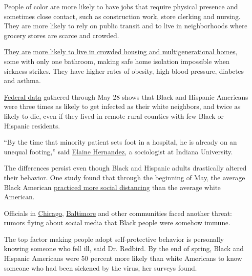 People of color are more likely to have jobs that require physical
presence and sometimes close contact, such as construction work, store
clerking and nursing. They are more likely to rely on public transit and
to live in neighborhoods where grocery stores are scarce and crowded.

\href{https://www.nytimes3xbfgragh.onion/interactive/2020/07/05/us/coronavirus-latinos-african-americans-cdc-data.html}{They
are}
\href{https://www.pewresearch.org/fact-tank/2018/04/05/a-record-64-million-americans-live-in-multigenerational-households/}{more
likely to live in crowded housing and multigenerational homes}, some
with only one bathroom, making safe home isolation impossible when
sickness strikes. They have higher rates of obesity, high blood
pressure, diabetes and asthma.

\href{https://www.nytimes3xbfgragh.onion/interactive/2020/07/05/us/coronavirus-latinos-african-americans-cdc-data.html}{Federal
data} gathered through May 28 shows that Black and Hispanic Americans
were three times as likely to get infected as their white neighbors, and
twice as likely to die, even if they lived in remote rural counties with
few Black or Hispanic residents.

``By the time that minority patient sets foot in a hospital, he is
already on an unequal footing,'' said
\href{https://www.newswise.com/coronavirus/iu-professor-available-to-discuss-social-bias-and-inequality-in-covid-crisis/?article_id=729760}{Elaine
Hernandez}, a sociologist at Indiana University.

The differences persist even though Black and Hispanic adults
drastically altered their behavior. One study found that through the
beginning of May, the average Black American
\href{https://www.medrxiv.org/content/10.1101/2020.06.04.20119131v1}{practiced
more social distancing} than the average white American.

Officials in
\href{https://blockclubchicago.org/2020/04/07/black-people-are-not-immune-to-coronavirus-debunking-deadly-social-media-myths/}{Chicago},
\href{https://www.baltimoresun.com/coronavirus/bs-md-baltimore-coronavirus-black-messaging-testing-20200414-cgqbwz6cmffabel364ixfktlje-story.html}{Baltimore}
and other communities faced another threat: rumors flying about social
media that Black people were somehow immune.

The top factor making people adopt self-protective behavior is
personally knowing someone who fell ill, said Dr. Redbird. By the end of
spring, Black and Hispanic Americans were 50 percent more likely than
white Americans to know someone who had been sickened by the virus, her
surveys found.

